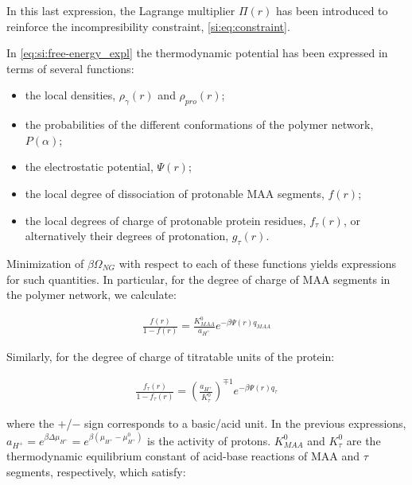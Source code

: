\documentclass[journal=jacsat,manuscript=suppinfo]{achemso}
\begin{document}
In this last expression, the Lagrange multiplier $\Pi(r)$ has been introduced to reinforce the incompresibility constraint, \cref{si:eq:constraint}.


In \cref{eq:si:free-energy_expl} the thermodynamic potential has been expressed in terms of several functions:
%
\begin{itemize}
	\item the local densities, $\rho_\gamma(r)$ and $\rho_{pro}(r)$;
	\item the probabilities of the different conformations of the polymer network, $P(\alpha)$;
	\item the electrostatic potential, $\Psi(r)$;
	\item the local degree of dissociation of protonable MAA segments, $f(r)$;
	\item the local degrees of charge of protonable protein residues, $f_\tau(r)$, or alternatively their degrees of protonation,  $g_\tau(r)$.
\end{itemize}
%
%
%



Minimization of $\beta\Omega_{NG}$ with respect to each of these functions yields expressions for such quantities.
In particular, for the degree of charge of MAA segments in the polymer network, we calculate:



\begin{align}
	\frac{f(r)}{1-f(r)}= \frac{K^0_{MAA}}{a_{H^+}}e^{-\beta \Psi(r) q_{MAA}}
	\label{eq:si:fMAA-degree}
\end{align}

Similarly, for the degree of charge of titratable units of the protein:

\begin{align}
	\frac{f_\tau(r)}{1-f_\tau(r)}= \left(\frac{a_{H^+}}{K^0_{\tau}}\right)^{\mp 1} e^{-\beta \Psi(r) q_{\tau}} 
	\label{eq:si:ftau-degree}
\end{align}



\noindent where the $+$/$-$ sign corresponds to a basic/acid unit.
In the previous expressions, $a_{H^+}=e^{\beta\Delta\mu_{H^+}}=e^{\beta(\mu_{H^+} -\mu^0_{H^+})}$ is the activity of protons.
$K^0_{MAA}$ and $K^0_{\tau}$ are the thermodynamic equilibrium  constant of  acid-base reactions of MAA and $\tau$ segments, respectively, which satisfy:
\end{document}
